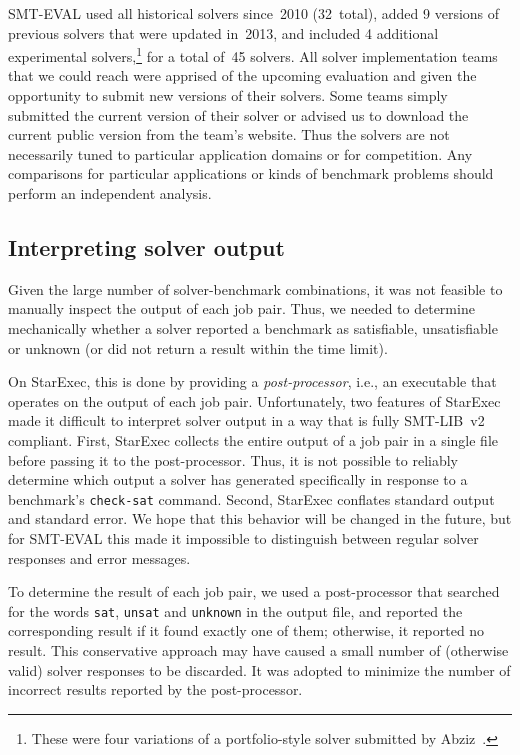 \documentclass[smallcondensed]{svjour3}
\begin{document}
SMT-EVAL used all historical solvers since~2010 (32~total), added 9 versions of previous solvers that were updated in~2013, and included 4 additional experimental solvers,\footnote{These were four variations of a portfolio-style solver submitted by Abziz~\cite{aziz:msc,aziz2012machine}.} for a total of~45 solvers.  All solver implementation teams that we could reach were apprised of the upcoming evaluation and given the opportunity to submit new versions of their solvers. Some teams simply submitted the current version of their solver or advised us to download the current public version from the team's website. Thus the solvers are not necessarily tuned to particular application domains or for competition. Any comparisons for particular applications or kinds of benchmark problems should perform an independent analysis.


\subsection{Interpreting solver output}

Given the large number of solver-benchmark combinations, it was not
feasible to manually inspect the output of each job pair.  Thus, we
needed to determine mechanically whether a solver reported a benchmark
as satisfiable, unsatisfiable or unknown (or did not return a result
within the time limit).

On StarExec, this is done by providing a \emph{post-processor}, i.e.,
an executable that operates on the output of each job pair.
Unfortunately, two features of StarExec made it difficult to interpret
solver output in a way that is fully SMT-LIB~v2 compliant.  First,
StarExec collects the entire output of a job pair in a single file
before passing it to the post-processor.  Thus, it is not possible to
reliably determine which output a solver has generated specifically in
response to a benchmark's {\tt check-sat} command.  Second, StarExec
conflates standard output and standard error.  We hope that this
behavior will be changed in the future, but for SMT-EVAL this made it
impossible to distinguish between regular solver responses and error
messages.

To determine the result of each job pair, we used a post-processor
that searched for the words {\tt sat}, {\tt unsat} and {\tt unknown}
in the output file, and reported the corresponding result if it found
exactly one of them; otherwise, it reported no result.  This
conservative approach may have caused a small number of (otherwise
valid) solver responses to be discarded.  It was adopted to minimize the
number of incorrect results reported by the post-processor.
\end{document}
